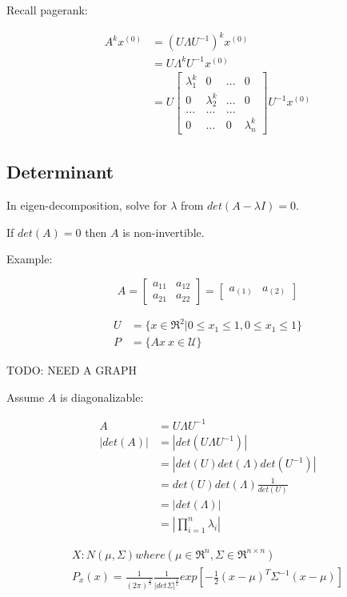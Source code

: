 Recall pagerank:

\begin{align*}
A^kx^{(0)} &= (U\Lambda U^{-1})^kx^{(0)}\\
&=U\Lambda^kU^{-1}x^{(0)} \\
&= U
\begin{bmatrix}
\lambda_1^k & 0 & ... & 0\\
0& \lambda_2^k  &  ... & 0\\
...  & ...  &   ...& \\
0    &  ... &  0 & \lambda_n^k
\end{bmatrix} U^{-1}x^{(0)}
\end{align*}

\subsection{Determinant}

In eigen-decomposition, solve for $\lambda$ from $det(A - \lambda I) = 0$. 

If $det(A) = 0$ then $A$ is non-invertible. 

Example:

$$A = 
\left[
\begin{matrix}
a_{11} & a_{12}\\
a_{21} & a_{22}
\end{matrix}
\right] =
\left[
\begin{matrix}
a_{(1)} & a_{(2)}
\end{matrix}
\right]
$$

\begin{align*}
U &= \{x\in \Re^2 | 0\leq x_1 \leq 1, 0\leq x_1 \leq 1 \}\\
P &= \{Ax \ x\in \mathcal{U}\} 
\end{align*}


TODO: NEED A GRAPH

Assume $A$ is diagonalizable:

\begin{align*}
A &= U\Lambda U^{-1}\\
|det(A)| &= |det(U\Lambda U^{-1})| \\
&= |det(U)det(\Lambda)det(U^{-1})|\\
&= det(U)det(\Lambda)\frac{1}{det(U)}\\
&= |det(\Lambda)|\\
&= |\prod^n_{i=1}\lambda_i|
\end{align*}

\begin{align*}
X: N(\mu, \Sigma)where(\mu \in \Re^n, \Sigma \in \Re^{n\times n})\\
P_x(x) = \frac{1}{(2\pi)^{\frac{2}{n}}}\frac{1}{|det\Sigma|^{\frac{1}{2}}}exp[-\frac{1}{2}(x - \mu)^T\Sigma^{-1}(x - \mu)]
\end{align*}




